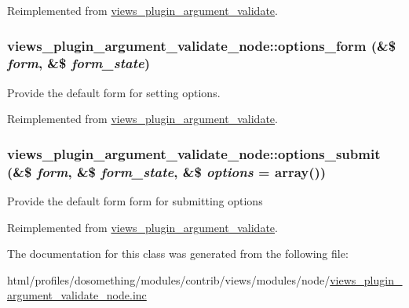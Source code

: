 Reimplemented from \hyperlink{classviews__plugin__argument__validate_aebc7a373a95a76ecb64345f558453b2d}{views\_\-plugin\_\-argument\_\-validate}.\hypertarget{classviews__plugin__argument__validate__node_a32bc6be973ce19c867ded106753d94e7}{
\subsubsection[{options\_\-form}]{\setlength{\rightskip}{0pt plus 5cm}views\_\-plugin\_\-argument\_\-validate\_\-node::options\_\-form (\&\$ {\em form}, \/  \&\$ {\em form\_\-state})}}
\label{classviews__plugin__argument__validate__node_a32bc6be973ce19c867ded106753d94e7}
Provide the default form for setting options. 

Reimplemented from \hyperlink{classviews__plugin__argument__validate_a619aac79800de4535d25fd93ce1f08cc}{views\_\-plugin\_\-argument\_\-validate}.\hypertarget{classviews__plugin__argument__validate__node_a81cd20811df44e2798d085a50902c5a3}{
\subsubsection[{options\_\-submit}]{\setlength{\rightskip}{0pt plus 5cm}views\_\-plugin\_\-argument\_\-validate\_\-node::options\_\-submit (\&\$ {\em form}, \/  \&\$ {\em form\_\-state}, \/  \&\$ {\em options} = {\ttfamily array()})}}
\label{classviews__plugin__argument__validate__node_a81cd20811df44e2798d085a50902c5a3}
Provide the default form form for submitting options 

Reimplemented from \hyperlink{classviews__plugin__argument__validate_aff1c9fc15ddc984fb1157f97274e3e6e}{views\_\-plugin\_\-argument\_\-validate}.

The documentation for this class was generated from the following file:\begin{DoxyCompactItemize}
\item 
html/profiles/dosomething/modules/contrib/views/modules/node/\hyperlink{views__plugin__argument__validate__node_8inc}{views\_\-plugin\_\-argument\_\-validate\_\-node.inc}\end{DoxyCompactItemize}

